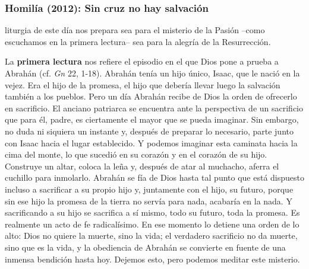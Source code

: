 \label{b2-03-02-2009A}
\newpage

\subsubsection{Homilía (2012): Sin cruz no hay salvación}


\begin{body}
 liturgia de este día nos prepara sea para el misterio de la Pasión –como escuchamos en la primera lectura– sea para la alegría de la Resurrección.

La \textbf{primera lectura} nos refiere el episodio en el que Dios pone a prueba a Abrahán (cf. \textit{Gn} 22, 1-18). Abrahán tenía un hijo único, Isaac, que le nació en la vejez. Era el hijo de la promesa, el hijo que debería llevar luego la salvación también a los pueblos. Pero un día Abrahán recibe de Dios la orden de ofrecerlo en sacrificio. El anciano patriarca se encuentra ante la perspectiva de un sacrificio que para él, padre, es ciertamente el mayor que se pueda imaginar. Sin embargo, no duda ni siquiera un instante y, después de preparar lo necesario, parte junto con Isaac hacia el lugar establecido. Y podemos imaginar esta caminata hacia la cima del monte, lo que sucedió en su corazón y en el corazón de su hijo. Construye un altar, coloca la leña y, después de atar al muchacho, aferra el cuchillo para inmolarlo. Abrahán se fía de Dios hasta tal punto que está dispuesto incluso a sacrificar a su propio hijo y, juntamente con el hijo, su futuro, porque sin ese hijo la promesa de la tierra no servía para nada, acabaría en la nada. Y sacrificando a su hijo se sacrifica a sí mismo, todo su futuro, toda la promesa. Es realmente un acto de fe radicalísimo. En ese momento lo detiene una orden de lo alto: Dios no quiere la muerte, sino la vida; el verdadero sacrificio no da muerte, sino que es la vida, y la obediencia de Abrahán se convierte en fuente de una inmensa bendición hasta hoy. Dejemos esto, pero podemos meditar este misterio.


\end{body}
